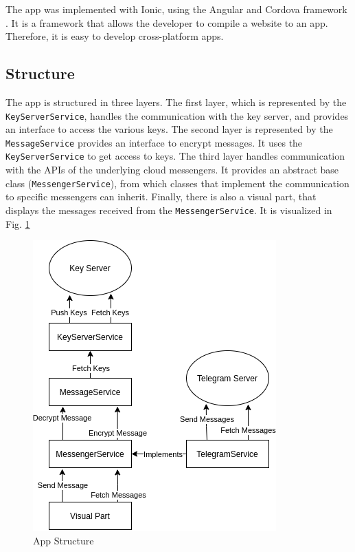\documentclass[a4paper, oneside]{discothesis}
\begin{document}
The app was implemented with Ionic, using the Angular and Cordova framework \cite{Ionic}. It is a framework that allows the developer to compile a website to an app. Therefore, it is easy to develop cross-platform apps.  

\subsection{Structure}

The app is structured in three layers. The first layer, which is represented by the \texttt{KeyServerService}, handles the communication with the key server, and provides an interface to access the various keys. The second layer is represented by the \texttt{MessageService} provides an interface to encrypt messages. It uses the \texttt{KeyServerService} to get access to keys. The third layer handles communication with the APIs of the underlying cloud messengers. It provides an abstract base class (\texttt{MessengerService}), from which classes that implement the communication to specific messengers can inherit. Finally, there is also a visual part, that displays the messages received from the \texttt{MessengerService}. It is visualized in Fig. \ref{fig:layers}

\begin{figure}[h!]
    \centering
    \includegraphics[width=0.8\columnwidth]{figures/layers.png}
    \caption{App Structure}
    \label{fig:layers}
\end{figure}
\end{document}

